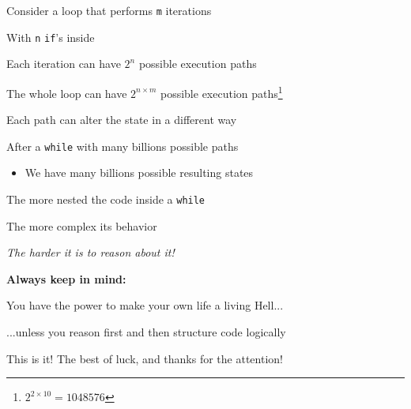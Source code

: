 \documentclass{beamer}
\begin{document}
\begin{slide}{
\item Consider a loop that performs \texttt{m} iterations
\item With \texttt{n} \texttt{if}'s inside
\item Each iteration can have $2^n$ possible execution paths
\item The whole loop can have $2^{n\times m}$ possible execution paths\footnote{$2^{2\times 10} = 1048576$}
}\end{slide}

\begin{slide}{
\item Each path can alter the state in a different way
\item After a \texttt{while} with many billions possible paths
\begin{itemize}
\item We have many billions possible resulting states
\end{itemize}
}\end{slide}

\begin{slide}{
\item The more nested the code inside a \texttt{while}
\item The more complex its behavior
\item \textit{The harder it is to reason about it!}
}\end{slide}

\begin{slide}{
\item \textbf{Always keep in mind:}
\item You have the power to make your own life a living Hell...
\pause
\item ...unless you reason first and then structure code logically
}\end{slide}

\begin{frame}{This is it!}
\center
\fontsize{18pt}{7.2}\selectfont
The best of luck, and thanks for the attention!
\end{frame}
\end{document}
